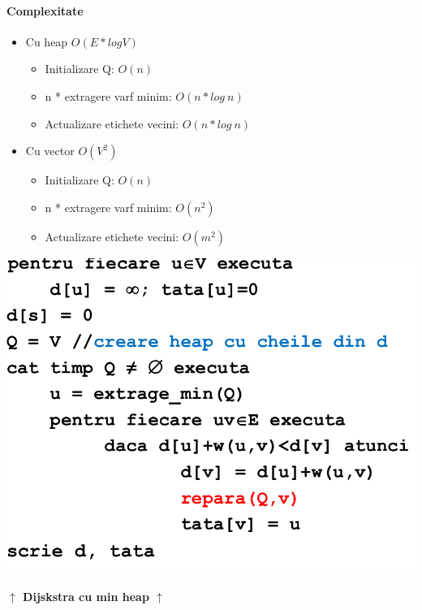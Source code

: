 \documentclass{article}
\begin{document}
\paragraph*{Complexitate}
\begin{itemize}
    \item Cu heap $O(E*logV)$
          \begin{itemize}
              \item Initializare Q: $O(n)$
              \item n * extragere varf minim: $O(n*log\ n)$
              \item Actualizare etichete vecini: $O(n*log\ n)$
          \end{itemize}
    \item Cu vector $O(V^2)$
          \begin{itemize}
              \item Initializare Q: $O(n)$
              \item n * extragere varf minim: $O(n^2)$
              \item Actualizare etichete vecini: $O(m^2)$
          \end{itemize}
\end{itemize}
\begin{center}
    \includegraphics[scale=0.3]{4_dijkstra.png}
\end{center}
\begin{center}
    \textbf{$\uparrow$ Dijskstra cu min heap $\uparrow$}
\end{center}
\end{document}
